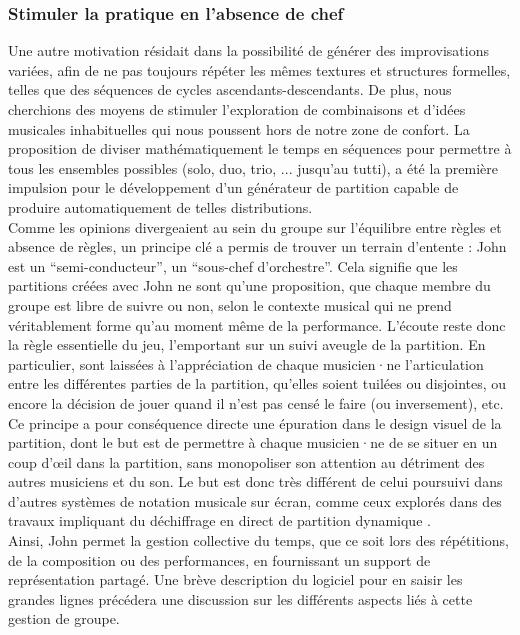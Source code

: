 \subsubsection{Stimuler la pratique en l'absence de chef}
%
\noindent Une autre motivation résidait dans la possibilité de générer des improvisations variées, afin de ne pas toujours répéter les mêmes textures et structures formelles, telles que des séquences de cycles ascendants-descendants. De plus, nous cherchions des moyens de stimuler l'exploration de combinaisons et d'idées musicales inhabituelles qui nous poussent hors de notre zone de confort. La proposition de diviser mathématiquement le temps en séquences pour permettre à tous les ensembles possibles (solo, duo, trio, ... jusqu'au tutti), a été la première impulsion pour le développement d'un générateur de partition capable de produire automatiquement de telles distributions.\\
\indent Comme les opinions divergeaient au sein du groupe sur l'équilibre entre règles et absence de règles, un principe clé a permis de trouver un terrain d'entente : John est un ``semi-conducteur'', un ``sous-chef d'orchestre''. Cela signifie que les partitions créées avec John ne sont qu'une proposition, que chaque membre du groupe est libre de suivre ou non, selon le contexte musical qui ne prend véritablement forme qu'au moment même de la performance. L'écoute reste donc la règle essentielle du jeu, l'emportant sur un suivi aveugle de la partition. En particulier, sont laissées à l'appréciation de chaque musicien·ne l'articulation entre les différentes parties de la partition, qu'elles soient tuilées ou disjointes, ou encore la décision de jouer quand il n'est pas censé le faire (ou inversement), etc.\\
\indent Ce principe a pour conséquence directe une épuration dans le design visuel de la partition, dont le but est de permettre à chaque musicien·ne de se situer en un coup d'œil dans la partition, sans monopoliser son attention au détriment des autres musiciens et du son. Le but est donc très différent de celui poursuivi dans d'autres systèmes de notation musicale sur écran, comme ceux explorés dans des travaux impliquant du déchiffrage en direct de partition dynamique \cite{freeman_extreme_2008}.\\
\indent Ainsi, John permet la gestion collective du temps, que ce soit lors des répétitions, de la composition ou des performances, en fournissant un support de représentation partagé. Une brève description du logiciel pour en saisir les grandes lignes précédera une discussion sur les différents aspects liés à cette gestion de groupe.

